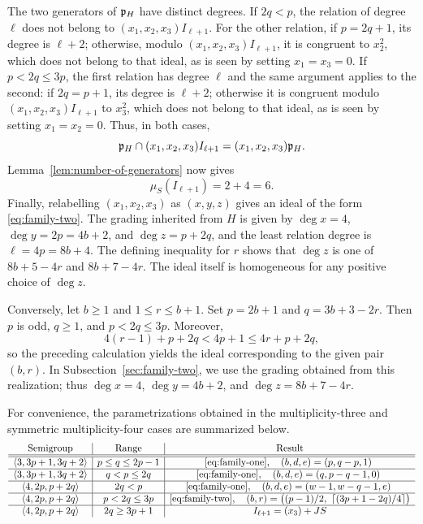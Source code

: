The two generators of $\mathfrak{p}_H$ have distinct degrees.  If $2q<p$, the
relation of degree $\ell$ does not belong to
$(x_1,x_2,x_3)I_{\ell+1}$.  For the other relation, if
$p=2q+1$, its degree is $\ell+2$; otherwise, modulo
$(x_1,x_2,x_3)I_{\ell+1}$, it is congruent to $x_2^2$, which does not belong
to that ideal, as is seen by setting $x_1=x_3=0$.  If $p<2q\leq3p$, the
first relation has degree $\ell$ and the same argument applies to the second:
if $2q=p+1$, its degree is $\ell+2$; otherwise it is congruent modulo
$(x_1,x_2,x_3)I_{\ell+1}$ to $x_3^2$, which does not belong to that ideal,
as is seen by setting $x_1=x_2=0$.
Thus, in both cases,
\[
 \mathfrak{p}_H\cap(x_1,x_2,x_3)I_{\ell+1}=(x_1,x_2,x_3)\mathfrak{p}_H.
\]
Lemma~\ref{lem:number-of-generators} now gives
\[
 \mu_S(I_{\ell+1})=2+4=6.
\]
Finally, relabelling $(x_1,x_2,x_3)$ as $(x,y,z)$ gives
an ideal of the form \eqref{eq:family-two}.
The grading inherited from $H$ is given by
$\deg x=4$, $\deg y=2p=4b+2$, and
$\deg z=p+2q$, and the least relation degree is $\ell=4p=8b+4$.
The defining inequality for $r$ shows that $\deg z$ is one of
$8b+5-4r$ and $8b+7-4r$.  The ideal itself is homogeneous for any positive
choice of $\deg z$.

Conversely, let $b\geq1$ and $1\leq r\leq b+1$.  Set
$p=2b+1$ and $q=3b+3-2r$.  Then $p$ is odd, $q\geq1$, and
$p<2q\leq3p$.  Moreover,
\[
 4(r-1)+p+2q<4p+1\leq4r+p+2q,
\]
so the preceding calculation yields the ideal corresponding to the given
pair $(b,r)$.
In Subsection~\ref{sec:family-two}, we use the grading obtained from this
realization; thus $\deg x=4$, $\deg y=4b+2$, and
$\deg z=8b+7-4r$.

For convenience, the parametrizations obtained in the multiplicity-three
and symmetric multiplicity-four cases are summarized below.  
\[
\begin{array}{c|c|c}
 \text{Semigroup}&\text{Range}&\text{Result}\\ \hline\hline
 \langle3,3p+1,3q+2\rangle
   &p\leq q\leq2p-1
   &\eqref{eq:family-one},\quad(b,d,e)=(p,q-p,1)\ \\ \hline
 \langle3,3p+1,3q+2\rangle
   &q<p\leq2q
   &\eqref{eq:family-one},\quad(b,d,e)=(q,p-q-1,0)\ \\ \hline
 \langle4,2p,p+2q\rangle
   &2q<p
   &\eqref{eq:family-one},\quad(b,d,e)=(w-1,w-q-1,e)\ \\ \hline
 \langle4,2p,p+2q\rangle
   &p<2q\leq3p
   &\eqref{eq:family-two},\quad (b,r)=\bigl((p-1)/2,\ \lceil(3p+1-2q)/4\rceil\bigr) \\ \hline
 \langle4,2p,p+2q\rangle
   &2q\geq3p+1
   &I_{\ell+1}=(x_3)+JS
\end{array}
\]

